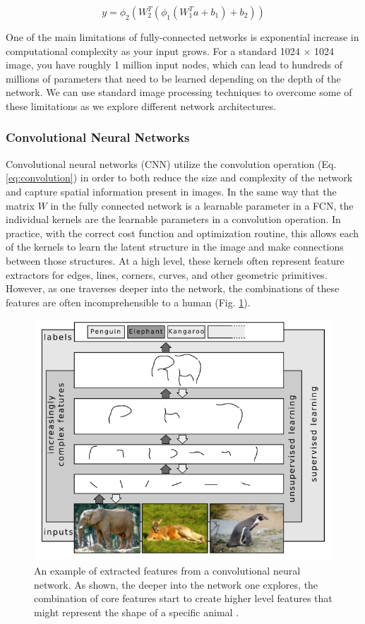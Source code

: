 \begin{equation}
    y = \phi_2 (W_2^{T}(\phi_1(W_1^{T}a + b_1) + b_2))
    \label{eq:2-layer-fcn}
\end{equation}

One of the main limitations of fully-connected networks is exponential increase in computational complexity as your input grows. For a standard 1024 $\times$ 1024 image, you have roughly 1 million input nodes, which can lead to hundreds of millions of parameters that need to be learned depending on the depth of the network. We can use standard image processing techniques to overcome some of these limitations as we explore different network architectures.

\subsubsection{Convolutional Neural Networks}

Convolutional neural networks (CNN) utilize the convolution operation (Eq. \ref{eq:convolution}) in order to both reduce the size and complexity of the network and capture spatial information present in images. In the same way that the matrix $W$ in the fully connected network is a learnable parameter in a FCN, the individual kernels are the learnable parameters in a convolution operation. In practice, with the correct cost function and optimization routine, this allows each of the kernels to learn the latent structure in the image and make connections between those structures. At a high level, these kernels often represent feature extractors for edges, lines, corners, curves, and other geometric primitives. However, as one traverses deeper into the network, the combinations of these features are often incomprehensible to a human (Fig. \ref{fig:conv-layers}). 

\begin{figure}[h!]
    \centering
    \includegraphics[width=0.7\linewidth]{figs/background/png/conv-layers.png}
    \caption{An example of extracted features from a convolutional neural network. As shown, the deeper into the network one explores, the combination of core features start to create higher level features that might represent the shape of a specific animal \cite{schulzDeepLearningLayerWise2012}.}
    \label{fig:conv-layers}
\end{figure}

